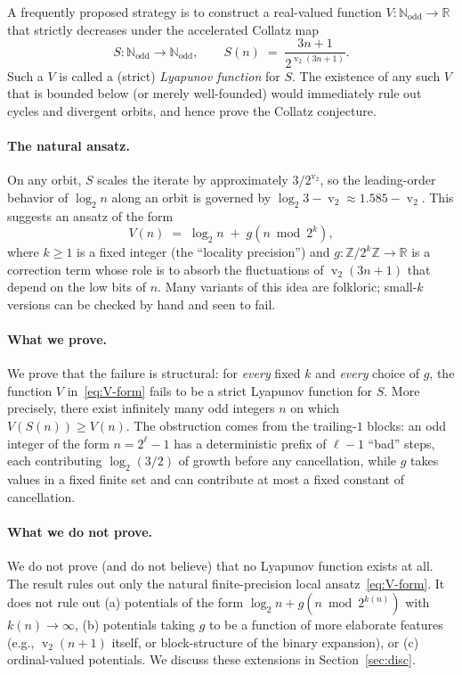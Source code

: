\documentclass[11pt,a4paper]{article}
\theoremstyle{definition}
\theoremstyle{remark}
\DeclareMathOperator{\val}{v}
\newcommand{\N}{\mathbb{N}}
\newcommand{\Z}{\mathbb{Z}}
\newcommand{\R}{\mathbb{R}}
\newcommand{\Nodd}{\N_{\mathrm{odd}}}
\begin{document}
A frequently proposed strategy is to construct a real-valued function
$V \colon \Nodd \to \R$ that strictly decreases under the accelerated
Collatz map
\begin{equation}\label{eq:S-def}
  S \colon \Nodd \to \Nodd, \qquad
  S(n) \;=\; \frac{3n + 1}{2^{\val_2(3n + 1)}}.
\end{equation}
Such a $V$ is called a (strict) \emph{Lyapunov function} for $S$.
The existence of any such $V$ that is bounded below (or merely
well-founded) would immediately rule out cycles and divergent orbits,
and hence prove the Collatz conjecture.

\paragraph{The natural ansatz.}
On any orbit, $S$ scales the iterate by approximately $3 / 2^{\val_2}$,
so the leading-order behavior of $\log_2 n$ along an orbit is governed
by $\log_2 3 - \val_2 \approx 1.585 - \val_2$.  This suggests an
ansatz of the form
\begin{equation}\label{eq:V-form}
  V(n) \;=\; \log_2 n \;+\; g(n \bmod 2^k),
\end{equation}
where $k \geq 1$ is a fixed integer (the ``locality precision'') and
$g \colon \Z / 2^k \Z \to \R$ is a correction term whose role is to
absorb the fluctuations of $\val_2(3n + 1)$ that depend on the low
bits of $n$.  Many variants of this idea are folkloric; small-$k$
versions can be checked by hand and seen to fail.

\paragraph{What we prove.}
We prove that the failure is structural: for \emph{every} fixed $k$ and
\emph{every} choice of $g$, the function $V$ in~\eqref{eq:V-form} fails
to be a strict Lyapunov function for $S$.  More precisely, there exist
infinitely many odd integers $n$ on which $V(S(n)) \geq V(n)$.  The
obstruction comes from the trailing-$1$ blocks: an odd integer of the
form $n = 2^\ell - 1$ has a deterministic prefix of $\ell - 1$
``bad'' steps, each contributing $\log_2(3/2)$ of growth before any
cancellation, while $g$ takes values in a fixed finite set and can
contribute at most a fixed constant of cancellation.

\paragraph{What we do not prove.}
We do not prove (and do not believe) that no Lyapunov function exists
at all.  The result rules out only the natural finite-precision local
ansatz~\eqref{eq:V-form}.  It does not rule out (a) potentials of the
form $\log_2 n + g(n \bmod 2^{k(n)})$ with $k(n) \to \infty$, (b)
potentials taking $g$ to be a function of more elaborate features
(e.g., $\val_2(n+1)$ itself, or block-structure of the binary
expansion), or (c) ordinal-valued potentials.  We discuss these
extensions in Section~\ref{sec:disc}.
\end{document}
